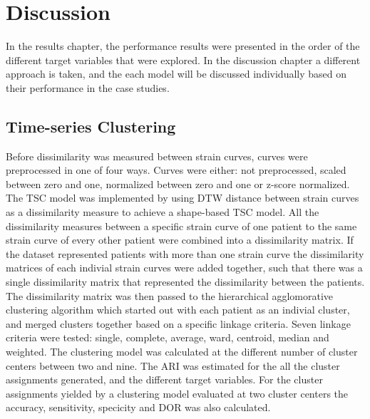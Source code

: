 \chapter{Discussion}

In the results chapter, the performance results were presented in the order of the different target variables that were explored. 
In the discussion chapter a different approach is taken, and the each model will be discussed individually based on their performance in the case studies.

\section{Time-series Clustering} \label{sec:disc_tsc}

Before dissimilarity was measured between strain curves, curves were preprocessed in one of four ways. 
Curves were either: not preprocessed, scaled between zero and one, normalized between zero and one or z-score normalized.
The TSC model was implemented by using DTW distance between strain curves as a dissimilarity measure to achieve a shape-based TSC model.
All the dissimilarity measures between a specific strain curve of one patient to the same strain curve of every other patient were combined into a dissimilarity matrix.
If the dataset represented patients with more than one strain curve the dissimilarity matrices of each indivial strain curves were added together, such that there was a single dissimilarity matrix that represented the dissimilarity between the patients.
The dissimilarity matrix was then passed to the hierarchical agglomorative clustering algorithm which started out with each patient as an indivial cluster, and merged clusters together based on a specific linkage criteria.
Seven linkage criteria were tested: single, complete, average, ward, centroid, median and weighted.
The clustering model was calculated at the different number of cluster centers between two and nine.
The ARI was estimated for the all the cluster assignments generated, and the different target variables.
For the cluster assignments yielded by a clustering model evaluated at two cluster centers the accuracy, sensitivity, specicity and DOR was also calculated. \bigskip

